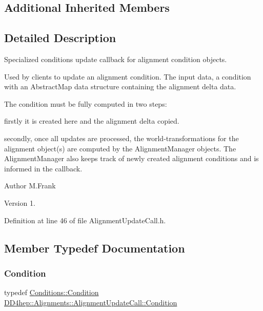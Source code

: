 \subsection*{Additional Inherited Members}


\subsection{Detailed Description}
Specialized conditions update callback for alignment condition objects. 

Used by clients to update an alignment condition. The input data, a condition with an Abstract\+Map data structure containing the alignment delta data.

The condition must be fully computed in two steps\+:
\begin{DoxyItemize}
\item firstly it is created here and the alignment delta copied.
\item secondly, once all updates are processed, the world-\/transformations for the alignment object(s) are computed by the Alignment\+Manager objects. The Alignment\+Manager also keeps track of newly created alignment conditions and is informed in the callback.
\end{DoxyItemize}

\begin{DoxyAuthor}{Author}
M.\+Frank 
\end{DoxyAuthor}
\begin{DoxyVersion}{Version}
1. 
\end{DoxyVersion}


Definition at line 46 of file Alignment\+Update\+Call.\+h.



\subsection{Member Typedef Documentation}
\hypertarget{class_d_d4hep_1_1_alignments_1_1_alignment_update_call_ac41c367dd7b7027a76d7b691223927fd}{}\label{class_d_d4hep_1_1_alignments_1_1_alignment_update_call_ac41c367dd7b7027a76d7b691223927fd} 
\subsubsection{\texorpdfstring{Condition}{Condition}}
{\footnotesize\ttfamily typedef \hyperlink{class_d_d4hep_1_1_conditions_1_1_condition}{Conditions\+::\+Condition} \hyperlink{class_d_d4hep_1_1_alignments_1_1_alignment_update_call_ac41c367dd7b7027a76d7b691223927fd}{D\+D4hep\+::\+Alignments\+::\+Alignment\+Update\+Call\+::\+Condition}}



